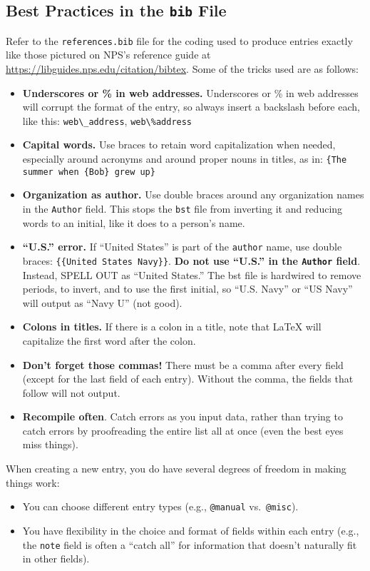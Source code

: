 \subsection{Best Practices in the {\tt bib} File}

Refer to the {\tt references.bib} file for the coding used to produce entries exactly like those pictured on NPS's reference guide at \url{https://libguides.nps.edu/citation/bibtex}. Some of the tricks used are as follows:
\begin{itemize}
    \item \textbf {Underscores or \% in web addresses.} Underscores or \% in web addresses will corrupt the format of the entry, so always insert a backslash before each, like this: {\tt web\textbackslash\_address}, {\tt web\textbackslash\%address}
    \item \textbf {Capital words.} Use braces to retain word capitalization when needed, especially around acronyms and around proper nouns in titles, as in: {\tt \{The summer when \{Bob\} grew up\}}
    \item \textbf {Organization as author.} Use double braces around any organization names in the {\tt Author} field. This stops the {\tt bst} file from inverting it and reducing words to an initial, like it does to a person's name.
    \item \textbf {``U.S.'' error.} If ``United States'' is part of the {\tt author} name, use double braces: {\tt \{\{United States Navy\}\}}. \textbf{Do not use ``U.S.'' in the {\tt Author} field}. Instead, SPELL OUT as ``United States.'' The bst file is hardwired to remove periods, to invert, and to use the first initial, so ``U.S. Navy'' or ``US Navy'' will output as ``Navy U'' (not good).
    \item \textbf {Colons in titles.} If there is a colon in a title, note that \LaTeX{} will capitalize the first word after the colon.
    \item \textbf {Don't forget those commas!} There must be a comma after every field (except for the last field of each entry). Without the comma, the fields that follow will not output.
    \item \textbf {Recompile often}. Catch errors as you input data, rather than trying to catch errors by proofreading the entire list all at once (even the best eyes miss things). 
\end{itemize}

When creating a new \BibTeX{} entry, you do have several degrees of freedom in making things work:
\begin{itemize}
    \item You can choose different entry types (e.g., {\tt @manual} vs.~{\tt @misc}).
    \item You have flexibility in the choice and format of fields within each entry (e.g., the {\tt note} field is often a ``catch all'' for information that doesn't naturally fit in other fields). 
\end{itemize}

